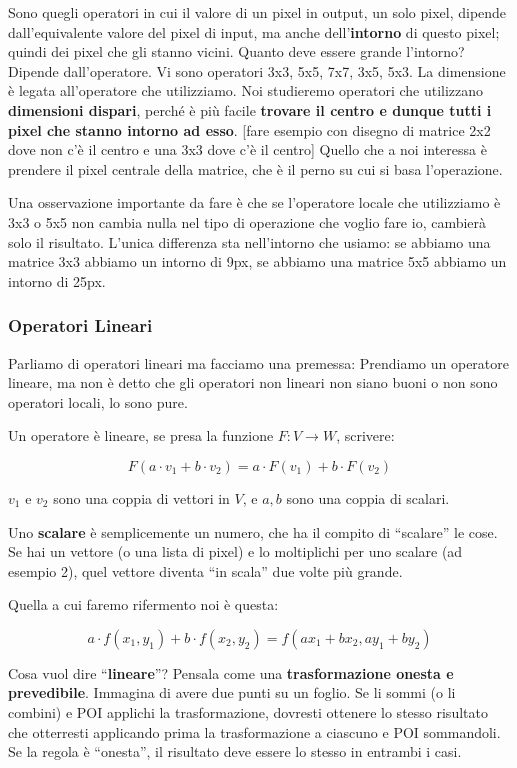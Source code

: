 \documentclass[
]{article}
\begin{document}
Sono quegli operatori in cui il valore di un pixel in output, un solo pixel, dipende dall'equivalente valore del pixel di input, ma anche dell'\textbf{intorno} di questo pixel; quindi dei pixel che gli stanno vicini.
Quanto deve essere grande l'intorno? Dipende dall'operatore. Vi sono operatori 3x3, 5x5, 7x7, 3x5, 5x3. La dimensione è legata all'operatore che utilizziamo.
Noi studieremo operatori che utilizzano \textbf{dimensioni dispari}, perché è più facile \textbf{trovare il centro e dunque tutti i pixel che stanno intorno ad esso}.
{[}fare esempio con disegno di matrice 2x2 dove non c'è il centro e una 3x3 dove c'è il centro{]}
Quello che a noi interessa è prendere il pixel centrale della matrice, che è il perno su cui si basa l'operazione.

Una osservazione importante da fare è che se l'operatore locale che utilizziamo è 3x3 o 5x5 non cambia nulla nel tipo di operazione che voglio fare io, cambierà solo il risultato. L'unica differenza sta nell'intorno che usiamo: se abbiamo una matrice 3x3 abbiamo un intorno di 9px, se abbiamo una matrice 5x5 abbiamo un intorno di 25px.

\hypertarget{operatori-lineari}{%
\subsubsection{Operatori Lineari}\label{operatori-lineari}}

Parliamo di operatori lineari ma facciamo una premessa: Prendiamo un operatore lineare, ma non è detto che gli operatori non lineari non siano buoni o non sono operatori locali, lo sono pure.

Un operatore è lineare, se presa la funzione \(F : V \rightarrow W\), scrivere:

\[
F(a \cdot v_1 + b \cdot v_2) = a \cdot F(v_1) + b \cdot F(v_2)
\]

\(v_1\) e \(v_ 2\) sono una coppia di vettori in \(V\), e \(a,b\) sono una coppia di scalari.

Uno \textbf{scalare} è semplicemente un numero, che ha il compito di ``scalare'' le cose. Se hai un vettore (o una lista di pixel) e lo moltiplichi per uno scalare (ad esempio 2), quel vettore diventa ``in scala'' due volte più grande.

Quella a cui faremo rifermento noi è questa:

\[
a \cdot f(x_1,y_1)+b \cdot f(x_2,y_2)=f(ax_1+bx_2,ay_1+by_2)
\]

Cosa vuol dire ``\textbf{lineare}''? Pensala come una \textbf{trasformazione onesta e prevedibile}.
Immagina di avere due punti su un foglio. Se li sommi (o li combini) e POI applichi la trasformazione, dovresti ottenere lo stesso risultato che otterresti applicando prima la trasformazione a ciascuno e POI sommandoli. Se la regola è ``onesta'', il risultato deve essere lo stesso in entrambi i casi.
\end{document}
